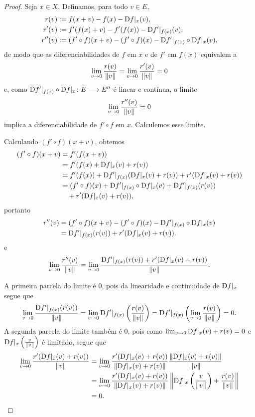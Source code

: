 \begin{proof} Seja $x \in X$. Definamos, para todo $v \in E$,
	\begin{align*}
	r(v) &:= f(x+v) - f(x) - \mathrm{D} f|_x(v), \\
	r'(v) &:= f'(f(x)+v) - f'(f(x)) - \mathrm{D} f'|_{f(x)}(v), \\
	r''(v) &:= (f' \circ f)(x+v) - (f' \circ f)(x) - \mathrm{D} f'|_{f(x)} \circ \mathrm{D} f|_x(v),
	\end{align*}
de modo que as diferenciabilidades de $f$ em $x$ e de $f'$ em $f(x)$ equivalem a
	\begin{equation*}
	\lim_{v \rightarrow 0} \frac{r(v)}{\left\Vert{v}\right\Vert} = \lim_{v \rightarrow 0} \frac{r'(v)}{\left\Vert{v}\right\Vert} = 0
	\end{equation*}
e, como $\mathrm{D} f'|_{f(x)} \circ \mathrm{D} f|_x\colon \allowbreak E \longrightarrow E''$ é linear e contínua, o limite
	\begin{equation*}
	\lim_{v \rightarrow 0} \frac{r''(v)}{\left\Vert{v}\right\Vert} = 0
	\end{equation*}
implica a diferenciabilidade de $f' \circ f$ em $x$. Calculemos esse limite.

Calculando $(f' \circ f)(x+v)$, obtemos
	\begin{align*}
	(f' \circ f)(x+v) &= f'(f(x+v)) \\
		&= f'(f(x)+\mathrm{D} f|_x(v) + r(v)) \\
		&= f'(f(x)) + \mathrm{D} f'|_{f(x)} (\mathrm{D} f|_x(v) + r(v)) + r'(\mathrm{D} f|_x(v) + r(v)) \\
		&= (f' \circ f)(x) + \mathrm{D} f'|_{f(x)} \circ \mathrm{D} f|_x(v) + \mathrm{D} f'|_{f(x)}(r(v)) \\
		&\quad + r'(\mathrm{D} f|_x(v) + r(v)),
	\end{align*}
portanto
	\begin{align*}
	r''(v) &= (f' \circ f)(x+v) - (f' \circ f)(x) - \mathrm{D} f'|_{f(x)} \circ \mathrm{D} f|_x(v) \\
		&= \mathrm{D} f'|_{f(x)}(r(v)) + r'(\mathrm{D} f|_x(v) + r(v)).
	\end{align*}
e
	\begin{equation*}
	\lim_{v \rightarrow 0} \frac{r''(v)}{\left\Vert{v}\right\Vert} = \lim_{v \rightarrow 0} \frac{\mathrm{D} f'|_{f(x)}(r(v)) + r'(\mathrm{D} f|_x(v) + r(v))}{\left\Vert{v}\right\Vert}.
	\end{equation*}

A primeira parcela do limite é $0$, pois da linearidade e continuidade de $\mathrm{D} f|_x$ segue que
	\begin{equation*}
	\lim_{v \rightarrow 0} \frac{\mathrm{D} f'|_{f(x)} (r(v))}{\left\Vert{v}\right\Vert} = \lim_{v \rightarrow 0} \mathrm{D} f'|_{f(x)} \left( \frac{r(v)}{\left\Vert{v}\right\Vert} \right) = \mathrm{D} f'|_{f(x)} \left( \lim_{v \rightarrow 0} \frac{r(v)}{\left\Vert{v}\right\Vert} \right) = 0.
	\end{equation*}
A segunda parcela do limite também é $0$, pois como $\lim_{v \rightarrow 0} \mathrm{D} f|_x(v) + r(v) = 0$ e $\mathrm{D} f|_x \left( \frac{v}{\left\Vert{v}\right\Vert} \right)$ é limitado, segue que
	\begin{align*}
	\lim_{v \rightarrow 0} \frac{r'(\mathrm{D} f|_x(v) + r(v))}{\left\Vert{v}\right\Vert} &= \lim_{v \rightarrow 0} \frac{r'(\mathrm{D} f|_x(v) + r(v))}{\left\Vert{\mathrm{D}f|_x(v) + r(v)}\right\Vert} \frac{\left\Vert{\mathrm{D}f|_x(v) + r(v)}\right\Vert}{\left\Vert{v}\right\Vert}\\
		&= \lim_{v \rightarrow 0} \frac{r'(\mathrm{D} f|_x(v) + r(v))}{\left\Vert{\mathrm{D}f|_x(v) + r(v)}\right\Vert} \left\Vert{\mathrm{D}f|_x \left( \frac{v}{\left\Vert{v}\right\Vert} \right) + \frac{r(v)}{\left\Vert{v}\right\Vert}}\right\Vert \\
		&= 0.
	\end{align*}


\end{proof}

